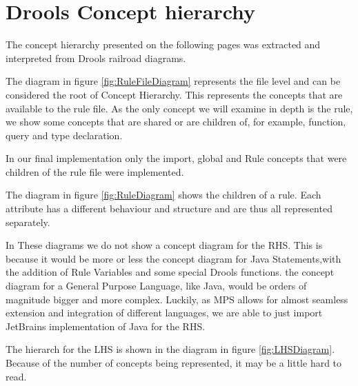 \chapter{Drools Concept hierarchy}
\label{appendix:DroolsConceptHierarchy}

The concept hierarchy presented on the following pages was extracted and interpreted from Drools railroad diagrams.

The diagram in figure \ref{fig:RuleFileDiagram} represents the file level and can be considered the root of Concept Hierarchy.
This represents the concepts that are available to the rule file.
As the only concept we will examine in depth is the rule, we show some concepts that are shared or are children of, for example, function, query and type declaration.

In our final implementation only the import, global and Rule concepts that were children of the rule file were implemented.

The diagram in figure \ref{fig:RuleDiagram} shows the children of a rule.
Each attribute has a different behaviour and structure and are thus all represented separately.

In These diagrams we do not show a concept diagram for the RHS.
This is because it would be more or less the concept diagram for Java Statements,with the addition of Rule Variables and some special Drools functions.
the concept diagram for a General Purpose Language, like Java, would be orders of magnitude bigger and more complex.
Luckily, as MPS allows for almost seamless extension and integration of different languages, we are able to just import JetBrains implementation of Java for the RHS.

The hierarch for the LHS is shown in the diagram in figure \ref{fig:LHSDiagram}.
Because of the number of concepts being represented, it may be a little hard to read.




